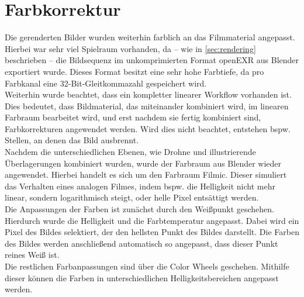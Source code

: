 
\section{Farbkorrektur}

Die gerenderten Bilder wurden weiterhin farblich an das Filmmaterial angepasst. Hierbei war sehr viel Spielraum vorhanden, da -- wie in \autoref{sec:rendering} beschrieben -- die Bildsequenz im unkomprimierten Format openEXR aus Blender exportiert wurde. Dieses Format besitzt eine sehr hohe Farbtiefe, da pro Farbkanal eine 32-Bit-Gleitkommazahl gespeichert wird. \\
Weiterhin wurde beachtet, dass ein kompletter linearer Workflow vorhanden ist. Dies bedeutet, dass Bildmaterial, das miteinander kombiniert wird, im linearen Farbraum bearbeitet wird, und erst nachdem sie fertig kombiniert sind, Farbkorrekturen angewendet werden. Wird dies nicht beachtet, entstehen bspw. Stellen, an denen das Bild ausbrennt. \\
Nachdem die unterschiedlichen Ebenen, wie Drohne und illustrierende Überlagerungen kombiniert wurden, wurde der Farbraum aus Blender wieder angewendet. Hierbei handelt es sich um den Farbraum Filmic. Dieser simuliert das Verhalten eines analogen Filmes, indem bspw. die Helligkeit nicht mehr linear, sondern logarithmisch steigt, oder helle Pixel entsättigt werden. \\
Die Anpassungen der Farben ist zunächst durch den Weißpunkt geschehen. Hierdurch wurde die Helligkeit und die Farbtemperatur angepasst. Dabei wird ein Pixel des Bildes selektiert, der den hellsten Punkt des Bildes darstellt. Die Farben des Bildes werden anschließend automatisch so angepasst, dass dieser Punkt reines Weiß ist.\\
Die restlichen Farbanpassungen sind über die Color Wheels geschehen. Mithilfe dieser können die Farben in unterschiedlichen Helligkeitsbereichen angepasst werden. 


